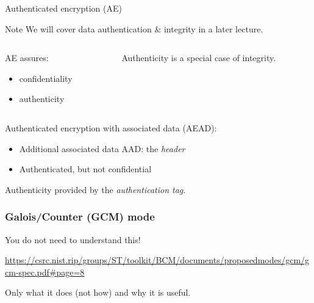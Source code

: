 \begin{frame}{Authenticated encryption (AE)}
  \begin{block}{Note}
    We will cover data authentication \& integrity in a later lecture.
  \end{block}

  \vspace*{1em}

  \begin{columns}[b]
    \begin{column}{0.4\textwidth}
      \pause
      AE assures:
      \begin{itemize}[<+->]
        \item confidentiality
        \item authenticity
      \end{itemize}
    \end{column}
    \begin{column}{0.53\textwidth}
      \pause
      Authenticity is a special case of integrity.
    \end{column}
  \end{columns}

  \vspace*{1em}

  \pause
  Authenticated encryption with associated data (AEAD):
  \begin{itemize}[<+->]
    \item Additional associated data AAD: the \emph{header}
    \item Authenticated, but not confidential
  \end{itemize}

  \vspace*{1em}

  \pause
  Authenticity provided by the \emph{authentication tag}.
\end{frame}

\begin{frame}
  \frametitle{Galois/Counter (GCM) mode}

  You do not need to understand this!
  \begin{center}
    \url{https://csrc.nist.rip/groups/ST/toolkit/BCM/documents/proposedmodes/gcm/gcm-spec.pdf\#page=8}
  \end{center}
  \pause
  Only what it does (not how) and why it is useful.
\end{frame}

